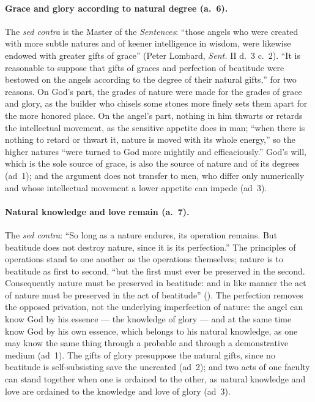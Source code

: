 \paragraph{Grace and glory according to natural degree (a.~6).} The
\emph{sed contra} is the Master of the \emph{Sentences}: ``those angels who
were created with more subtle natures and of keener intelligence in
wisdom, were likewise endowed with greater gifts of grace'' (Peter
Lombard, \emph{Sent.} II d.~3 c.~2). ``It is reasonable to suppose that
gifts of graces and perfection of beatitude were bestowed on the angels
according to the degree of their natural gifts,'' for two reasons. On
God's part, the grades of nature were made for the grades of grace and
glory, as the builder who chisels some stones more finely sets them
apart for the more honored place. On the angel's part, nothing in him
thwarts or retards the intellectual movement, as the sensitive appetite
does in man; ``when there is nothing to retard or thwart it, nature is
moved with its whole energy,'' so the higher natures ``were turned to
God more mightily and efficaciously.'' God's will, which is the sole
source of grace, is also the source of nature and of its degrees (ad~1);
and the argument does not transfer to men, who differ only numerically
and whose intellectual movement a lower appetite can impede (ad~3).

\paragraph{Natural knowledge and love remain (a.~7).} The \emph{sed
contra}: ``So long as a nature endures, its operation remains. But
beatitude does not destroy nature, since it is its perfection.'' The
principles of operations stand to one another as the operations
themselves; nature is to beatitude as first to second, ``but the first
must ever be preserved in the second. Consequently nature must be
preserved in beatitude: and in like manner the act of nature must be
preserved in the act of beatitude'' (). The perfection removes the opposed privation, not
the underlying imperfection of nature: the angel can know God by his
essence --- the knowledge of glory --- and at the same time know God by
his own essence, which belongs to his natural knowledge, as one may know
the same thing through a probable and through a demonstrative medium
(ad~1). The gifts of glory presuppose the natural gifts, since no
beatitude is self-subsisting save the uncreated (ad~2); and two acts of
one faculty can stand together when one is ordained to the other, as
natural knowledge and love are ordained to the knowledge and love of
glory (ad~3).


